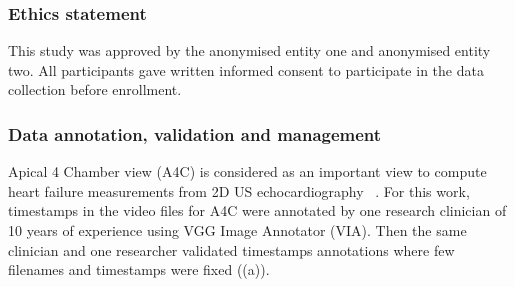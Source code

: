 \documentclass[mlabstract,twocolumn]{jmlr}
\begin{document}
\subsubsection{Ethics statement}
This study was approved by the anonymised entity one and anonymised entity two.
All participants gave written informed consent to participate in the data collection before enrollment.

\subsubsection{Data annotation, validation and management}
Apical 4 Chamber view (A4C) is considered as an important view to compute heart failure measurements from 2D US echocardiography ~\citep{2017_hall_JIntensiveCareSociety}.
For this work, timestamps in the video files for A4C were annotated by one research clinician of 10 years of experience using VGG Image Annotator (VIA).
Then the same clinician  and one researcher validated timestamps annotations where few filenames and timestamps were fixed ((a)).
\end{document}
